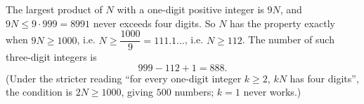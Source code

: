 The largest product of $N$ with a one-digit positive integer is $9N$, and $9N\le9\cdot999=8991$ never exceeds four digits. So $N$ has the property exactly when $9N\ge1000$, i.e. $N\ge\dfrac{1000}{9}=111.1\ldots$, i.e. $N\ge112$. The number of such three-digit integers is
\[
999-112+1=\boxed{888}.
\]
(Under the stricter reading ``for every one-digit integer $k\ge2$, $kN$ has four digits'', the condition is $2N\ge1000$, giving $500$ numbers; $k=1$ never works.)
